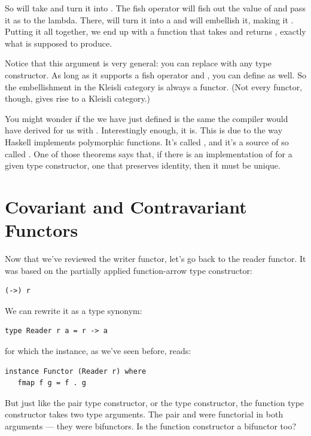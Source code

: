 So  will take  and turn it into
. The fish operator will fish out the value of
 and pass it as  to the lambda. There, 
will turn it into a  and  will embellish it,
making it . Putting it all together, we end up with a
function that takes  and returns ,
exactly what  is supposed to produce.

Notice that this argument is very general: you can replace
 with any type constructor. As long as it supports a fish
operator and , you can define  as well. So
the embellishment in the Kleisli category is always a functor. (Not
every functor, though, gives rise to a Kleisli category.)

You might wonder if the  we have just defined is the same
 the compiler would have derived for us with
. Interestingly enough, it is. This is due to
the way Haskell implements polymorphic functions. It's called
, and it's a source of so called
. One of those theorems says that, if there is
an implementation of  for a given type constructor, one
that preserves identity, then it must be unique.

\section{Covariant and Contravariant
Functors}\label{covariant-and-contravariant-functors}

Now that we've reviewed the writer functor, let's go back to the reader
functor. It was based on the partially applied function-arrow type
constructor:

\begin{Verbatim}[commandchars=\\\{\}]
(->) r
\end{Verbatim}
We can rewrite it as a type synonym:

\begin{Verbatim}[commandchars=\\\{\}]
type Reader r a = r -> a
\end{Verbatim}
for which the  instance, as we've seen before, reads:

\begin{Verbatim}[commandchars=\\\{\}]
instance Functor (Reader r) where
   fmap f g = f . g
\end{Verbatim}
But just like the pair type constructor, or the  type
constructor, the function type constructor takes two type arguments. The
pair and  were functorial in both arguments --- they were
bifunctors. Is the function constructor a bifunctor too?

